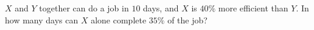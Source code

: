 $X$ and $Y$ together can do a job in $10$ days, and $X$ is $40\%$ more efficient than $Y$. In how many days can $X$ alone complete $35\%$ of the job?
